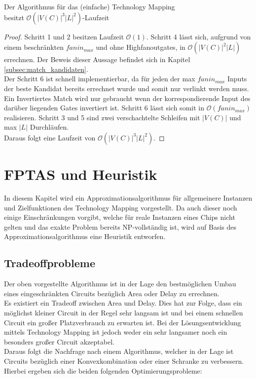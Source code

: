 \documentclass[11pt, a4paper, german]{article}
\newcommand{\TM}{Technology  Mapping }
\begin{document}
\begin{cor}{Der Algorithmus für das (einfache) \TM  \\ besitzt $\mathcal{O}(  |V(C)|^3|L|^2)$-Laufzeit}
\end{cor}
\begin{proof}
Schritt 1 und 2 besitzen Laufzeit $\mathcal{O}(1)$. Schritt 4 lässt sich, aufgrund von einem beschränkten $fanin_{max}$ und ohne Highfanoutgates, in $\mathcal{O}(|V(C)|^2|L|)$ errechnen. Der Beweis dieser Aussage befindet sich in Kapitel \ref{subsec:match_kandidaten}.\\
Der Schritt 6 ist schnell implementierbar, da für jeden der max $fanin_{max}$ Inputs der beste Kandidat bereits errechnet wurde und somit nur verlinkt werden muss. Ein Invertiertes Match wird nur gebraucht wenn der korrespondierende Input des darüber liegenden Gates invertiert ist. Schritt 6 lässt sich somit in  $\mathcal{O}(fanin_{max})$ realisieren. Schritt 3 und 5 sind zwei verschachtelte Schleifen mit  $|V(C)|$ und max $|L|$ Durchläufen. \\
Daraus folgt eine Laufzeit von $\mathcal{O}(  |V(C)|^3|L|^2)$.
\end{proof}



\newpage
\section{FPTAS und Heuristik}
\label{sec:allg_algorithmus}
In diesem Kapitel wird ein Approximationsalgorithmus für allgemeinere Instanzen und Zielfunktionen des \TM vorgestellt. Da auch dieser noch einige Einschränkungen vorgibt, welche für reale Instanzen eines Chips nicht gelten und   das exakte Problem bereits NP-vollständig ist, wird auf Basis des Approximationsalgorithmus eine Heuristik entworfen.

\subsection{Tradeoffprobleme}
\label{subsec:tradeoffprobleme}
Der oben vorgestellte Algorithmus ist in der Lage den bestmöglichen Umbau eines eingeschränkten Circuits bezüglich Area oder Delay zu errechnen. \\
Es existiert  ein Tradeoff zwischen Area und Delay. Dies hat zur Folge, dass ein möglichst kleiner Circuit in der Regel sehr langsam ist und  bei einem schnellen Circuit ein großer Platzverbrauch zu erwarten ist. 
Bei der Lösungsentwicklung mittels \TM  ist jedoch weder ein sehr langsamer noch ein besonders großer Circuit akzeptabel.\\
Daraus folgt die Nachfrage nach einem Algorithmus, welcher in der Lage ist Circuits  bezüglich einer Konvexkombination oder einer Schranke zu verbessern. Hierbei ergeben sich die beiden folgenden Optimierungsprobleme: 
\end{document}
